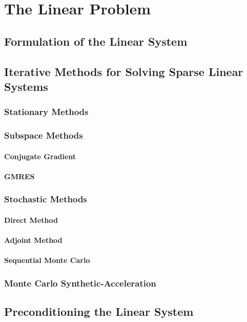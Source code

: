 \chapter{The Linear Problem}
\label{ch:linear_problem}

\section{Formulation of the Linear System}
\label{sec:linear_system}

\section{Iterative Methods for Solving Sparse Linear Systems}
\label{sec:linear_methods}

\subsection{Stationary Methods}
\label{subsec:stationary_methods}

\subsection{Subspace Methods}
\label{subsec:subspace_methods}

\subsubsection{Conjugate Gradient}
\label{subsubsec:conjugate_gradient}

\subsubsection{GMRES}
\label{subsubsec:gmres}

\subsection{Stochastic Methods}
\label{subsec:stochastic_methods}

\subsubsection{Direct Method}
\label{subsubsec:direct_mc}

\subsubsection{Adjoint Method}
\label{subsubsec:adjoint_mc}

\subsubsection{Sequential Monte Carlo}
\label{subsusbsec:sequential_mc}

\subsection{Monte Carlo Synthetic-Acceleration}
\label{subsec:mcsa}

\section{Preconditioning the Linear System}
\label{sec:linear_preconditioning}

